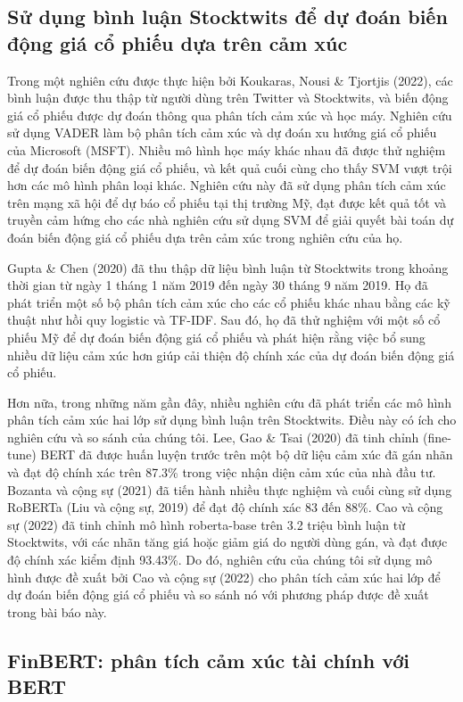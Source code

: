 \subsection*{Sử dụng bình luận Stocktwits để dự đoán biến động giá cổ phiếu dựa trên cảm xúc}

Trong một nghiên cứu được thực hiện bởi Koukaras, Nousi \& Tjortjis (2022), các bình luận được thu thập từ người dùng trên Twitter và Stocktwits, và biến động giá cổ phiếu được dự đoán thông qua phân tích cảm xúc và học máy. Nghiên cứu sử dụng VADER làm bộ phân tích cảm xúc và dự đoán xu hướng giá cổ phiếu của Microsoft (MSFT). Nhiều mô hình học máy khác nhau đã được thử nghiệm để dự đoán biến động giá cổ phiếu, và kết quả cuối cùng cho thấy SVM vượt trội hơn các mô hình phân loại khác. Nghiên cứu này đã sử dụng phân tích cảm xúc trên mạng xã hội để dự báo cổ phiếu tại thị trường Mỹ, đạt được kết quả tốt và truyền cảm hứng cho các nhà nghiên cứu sử dụng SVM để giải quyết bài toán dự đoán biến động giá cổ phiếu dựa trên cảm xúc trong nghiên cứu của họ.

Gupta \& Chen (2020) đã thu thập dữ liệu bình luận từ Stocktwits trong khoảng thời gian từ ngày 1 tháng 1 năm 2019 đến ngày 30 tháng 9 năm 2019. Họ đã phát triển một số bộ phân tích cảm xúc cho các cổ phiếu khác nhau bằng các kỹ thuật như hồi quy logistic và TF-IDF. Sau đó, họ đã thử nghiệm với một số cổ phiếu Mỹ để dự đoán biến động giá cổ phiếu và phát hiện rằng việc bổ sung nhiều dữ liệu cảm xúc hơn giúp cải thiện độ chính xác của dự đoán biến động giá cổ phiếu.

Hơn nữa, trong những năm gần đây, nhiều nghiên cứu đã phát triển các mô hình phân tích cảm xúc hai lớp sử dụng bình luận trên Stocktwits. Điều này có ích cho nghiên cứu và so sánh của chúng tôi. Lee, Gao \& Tsai (2020) đã tinh chỉnh (fine-tune) BERT đã được huấn luyện trước trên một bộ dữ liệu cảm xúc đã gán nhãn và đạt độ chính xác trên 87.3\% trong việc nhận diện cảm xúc của nhà đầu tư. Bozanta và cộng sự (2021) đã tiến hành nhiều thực nghiệm và cuối cùng sử dụng RoBERTa (Liu và cộng sự, 2019) để đạt độ chính xác 83 đến 88\%. Cao và cộng sự (2022) đã tinh chỉnh mô hình roberta-base trên 3.2 triệu bình luận từ Stocktwits, với các nhãn tăng giá hoặc giảm giá do người dùng gán, và đạt được độ chính xác kiểm định 93.43\%. Do đó, nghiên cứu của chúng tôi sử dụng mô hình được đề xuất bởi Cao và cộng sự (2022) cho phân tích cảm xúc hai lớp để dự đoán biến động giá cổ phiếu và so sánh nó với phương pháp được đề xuất trong bài báo này.

\subsection*{FinBERT: phân tích cảm xúc tài chính với BERT}


